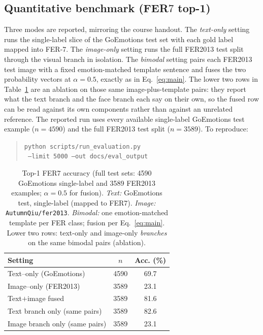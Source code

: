 \documentclass[sigconf,nonacm]{acmart}
\begin{document}
  \subsection{Quantitative benchmark (FER\texorpdfstring{$7$}{\,7} top-1)}
  Three modes are reported, mirroring the course handout. The \emph{text-only} setting runs the single-label slice of the GoEmotions test set with each gold label mapped into FER-7. The \emph{image-only} setting runs the full FER2013 test split through the visual branch in isolation. The \emph{bimodal} setting pairs each FER2013 test image with a fixed emotion-matched template sentence and fuses the two probability vectors at $\alpha\!=\!0.5$, exactly as in Eq.~\ref{eq:main}. The lower two rows in Table~\ref{tab:results} are an ablation on those same image-plus-template pairs: they report what the text branch and the face branch each say on their own, so the fused row can be read against its own components rather than against an unrelated reference. The reported run uses every available single-label GoEmotions test example ($n\!=\!4590$) and the full FER2013 test split ($n\!=\!3589$). To reproduce:
  \begin{quote}\small\noindent
  \texttt{python scripts/run\_evaluation.py}\\
  \texttt{\hspace*{1em} --limit 5000 --out docs/eval\_output}
  \end{quote}

  \begin{table}[t]
    \centering
    \small
    \caption{Top-1 FER$7$ accuracy (full test sets: 4590 GoEmotions single-label and 3589 FER2013 examples; $\alpha\!=\!0.5$ for fusion). \emph{Text:} GoEmotions test, single-label (mapped to FER$7$). \emph{Image:} \texttt{AutumnQiu/fer2013}. \emph{Bimodal:} one emotion-matched template per FER class; fusion per Eq.~\ref{eq:main}. Lower two rows: text-only and image-only \emph{branches} on the same bimodal pairs (ablation).}
    \label{tab:results}
    \begin{tabular}{@{}lcc@{}}
      \toprule
      \textbf{Setting} & \textbf{$n$} & \textbf{Acc. (\%)} \\
      \midrule
      Text--only (GoEmotions) & 4590 & 69.7 \\
      Image--only (FER2013) & 3589 & 23.1 \\
      Text$+$image fused & 3589 & 81.6 \\
      \midrule
      Text branch only (same pairs) & 3589 & 82.6 \\
      Image branch only (same pairs) & 3589 & 23.1 \\
      \bottomrule
    \end{tabular}
  \end{table}
\end{document}

